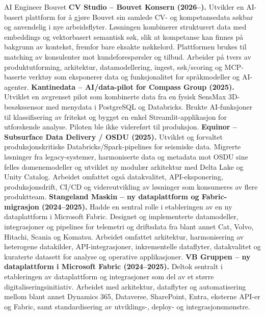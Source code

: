 \documentclass[a4paper,
		10pt]{article}
\begin{document}
	{AI Engineer}
	{Bouvet}
	{
	\textbf{CV Studio -- Bouvet Konsern (2026--).} Utvikler en AI-basert plattform for å gjøre Bouvet sin samlede CV- og kompetansedata søkbar og anvendelig i nye arbeidsflyter. Løsningen kombinerer strukturert data med embeddings og vektorbasert semantisk søk, slik at kompetanse kan finnes på bakgrunn av kontekst, fremfor bare eksakte nøkkelord. Plattformen brukes til matching av konsulenter mot kundeforespørsler og tilbud. Arbeider på tvers av produktutforming, arkitektur, datamodellering, ingest, søk/scoring og MCP-baserte verktøy som eksponerer data og funksjonalitet for språkmodeller og AI-agenter.
	\newline\vspace{.15cm}
	\textbf{Kantinedata -- AI/data-pilot for Compass Group (2025).} Utviklet en avgrenset pilot som kombinerte data fra en fysisk SensMax 3D-besøkssensor med menydata i PostgreSQL og Databricks. Brukte AI-funksjoner til klassifisering av fritekst og bygget en enkel Streamlit-applikasjon for utforskende analyse. Piloten ble ikke videreført til produksjon.
	\newline\vspace{.15cm}
	\textbf{Equinor -- Subsurface Data Delivery / OSDU (2025).} Utviklet og forvaltet produksjonskritiske Databricks/Spark-pipelines for seismiske data. Migrerte løsninger fra legacy-systemer, harmoniserte data og metadata mot OSDU sine felles domenemodeller og utviklet ny modulær arkitektur med Delta Lake og Unity Catalog. Arbeidet omfattet også datakvalitet, API-eksponering, produksjonsdrift, CI/CD og videreutvikling av løsninger som konsumeres av flere produktteam.
	\newline\vspace{.15cm}
	\textbf{Stangeland Maskin -- ny dataplattform og Fabric-migrasjon (2024--2025).} Hadde en sentral rolle i etableringen av en ny dataplattform i Microsoft Fabric. Designet og implementerte datamodeller, integrasjoner og pipelines for telemetri og driftsdata fra blant annet Cat, Volvo, Hitachi, Scania og Komatsu. Arbeidet omfattet arkitektur, harmonisering av heterogene datakilder, API-integrasjoner, inkrementelle dataflyter, datakvalitet og kuraterte datasett for analyse og operative applikasjoner.
	\newline\vspace{.15cm}
	\textbf{VB Gruppen -- ny dataplattform i Microsoft Fabric (2024--2025).} Deltok sentralt i etableringen av dataplattform og integrasjoner som del av et større digitaliseringsinitiativ. Arbeidet med arkitektur, dataflyter og automatisering mellom blant annet Dynamics 365, Dataverse, SharePoint, Entra, eksterne API-er og Fabric, samt standardisering av utviklings-, deploy- og integrasjonsmønstre.
}
\end{document}
